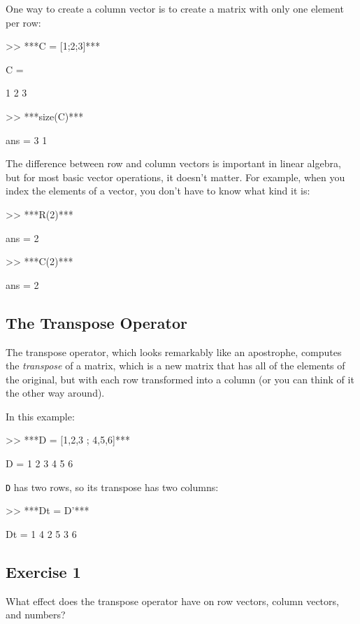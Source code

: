 One way to create a column vector is to create a matrix with only
one element per row:

\begin{code}
>> ***C = [1;2;3]***

C =

     1
     2
     3

>> ***size(C)***

ans = 3     1
\end{code}

The difference between row and column vectors is important in
linear algebra, but for most basic vector operations, it doesn't matter.  
For example, when you index the elements of a vector, you don't have to know what kind
it is:


\begin{code}
>> ***R(2)***

ans = 2

>> ***C(2)***

ans = 2
\end{code}


\subsection{The Transpose Operator}

The transpose operator, which looks remarkably like an apostrophe,
computes the {\em transpose} of a matrix, which is a new matrix
that has all of the elements of the original, but with each row
transformed into a column (or you can think of it the other way around).


In this example:

\begin{code}
>> ***D = [1,2,3 ; 4,5,6]***

D =  1     2     3
     4     5     6
\end{code}
\lstinline{D} has two rows, so its transpose has two columns:

\begin{code}
>> ***Dt = D'***

Dt = 1     4
     2     5
     3     6
\end{code}

\subsection{Exercise 1}
What effect does the transpose operator
have on row vectors, column vectors, and numbers?

